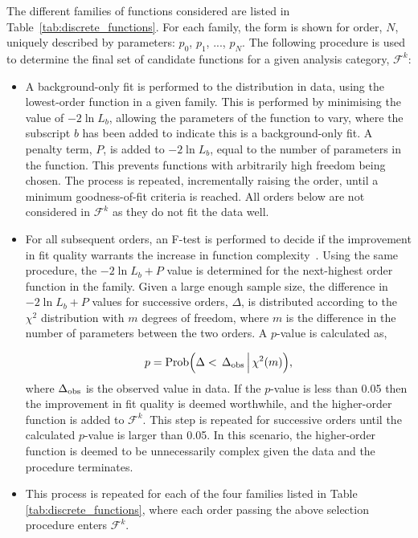 The different families of functions considered are listed in Table~\ref{tab:discrete_functions}. For each family, the form is shown for order, $N$, uniquely described by parameters: $p_0$, $p_1$, ..., $p_N$. The following procedure is used to determine the final set of candidate functions for a given analysis category, $\mathcal{F}^k$:
\begin{itemize}
    \item A background-only fit is performed to the \mgg distribution in data, using the lowest-order function in a given family. This is performed by minimising the value of $-2\ln{L}_b$, allowing the parameters of the function to vary, where the subscript $b$ has been added to indicate this is a background-only fit. A penalty term, $P$, is added to $-2\ln{L}_b$, equal to the number of parameters in the function. This prevents functions with arbitrarily high freedom being chosen. The process is repeated, incrementally raising the order, until a minimum goodness-of-fit criteria is reached. All orders below are not considered in $\mathcal{F}^k$ as they do not fit the data well.
    
    \item For all subsequent orders, an F-test is performed to decide if the improvement in fit quality warrants the increase in function complexity~\cite{10.2307/2340521}. Using the same procedure, the $-2\ln{L}_b+P$ value is determined for the next-highest order function in the family. Given a large enough sample size, the difference in $-2\ln{L}_b+P$ values for successive orders, $\Delta$, is distributed according to the $\chi^2$ distribution with $m$ degrees of freedom, where $m$ is the difference in the number of parameters between the two orders. A $p$-value is calculated as,
    
    \begin{equation}
        p = {\rm{Prob}}\Big(\Delta<\,\Delta_{\rm{obs}}\,\Big|\,\chi^2(m)\Big),
    \end{equation}
    \noindent
    where $\Delta_{\rm{obs}}$ is the observed value in data. If the $p$-value is less than 0.05 then the improvement in fit quality is deemed worthwhile, and the higher-order function is added to $\mathcal{F}^k$. This step is repeated for successive orders until the calculated $p$-value is larger than 0.05. In this scenario, the higher-order function is deemed to be unnecessarily complex given the data and the procedure terminates.

    \item This process is repeated for each of the four families listed in Table \ref{tab:discrete_functions}, where each order passing the above selection procedure enters $\mathcal{F}^k$.
\end{itemize}

